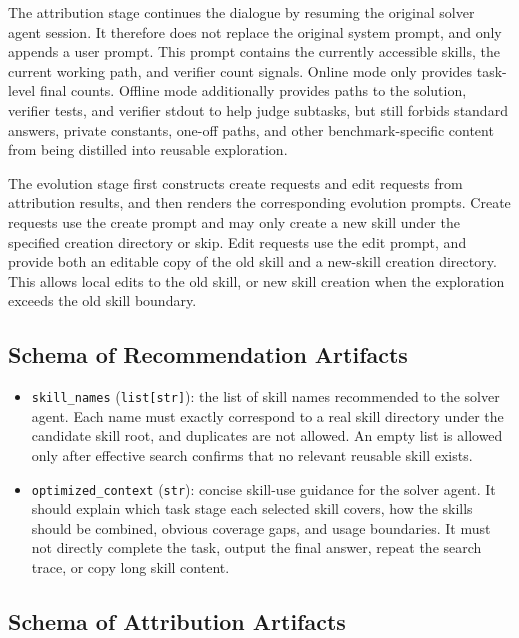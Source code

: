 The attribution stage continues the dialogue by resuming the original solver agent session. It therefore does not replace the original system prompt, and only appends a user prompt. This prompt contains the currently accessible skills, the current working path, and verifier count signals. Online mode only provides task-level final counts. Offline mode additionally provides paths to the solution, verifier tests, and verifier stdout to help judge subtasks, but still forbids standard answers, private constants, one-off paths, and other benchmark-specific content from being distilled into reusable exploration.

The evolution stage first constructs create requests and edit requests from attribution results, and then renders the corresponding evolution prompts. Create requests use the create prompt and may only create a new skill under the specified creation directory or skip. Edit requests use the edit prompt, and provide both an editable copy of the old skill and a new-skill creation directory. This allows local edits to the old skill, or new skill creation when the exploration exceeds the old skill boundary.

\subsection{Schema of Recommendation Artifacts}

\begin{itemize}
    \item \texttt{skill\_names} (\texttt{list[str]}): the list of skill names recommended to the solver agent. Each name must exactly correspond to a real skill directory under the candidate skill root, and duplicates are not allowed. An empty list is allowed only after effective search confirms that no relevant reusable skill exists.
    \item \texttt{optimized\_context} (\texttt{str}): concise skill-use guidance for the solver agent. It should explain which task stage each selected skill covers, how the skills should be combined, obvious coverage gaps, and usage boundaries. It must not directly complete the task, output the final answer, repeat the search trace, or copy long skill content.
\end{itemize}

\subsection{Schema of Attribution Artifacts}

